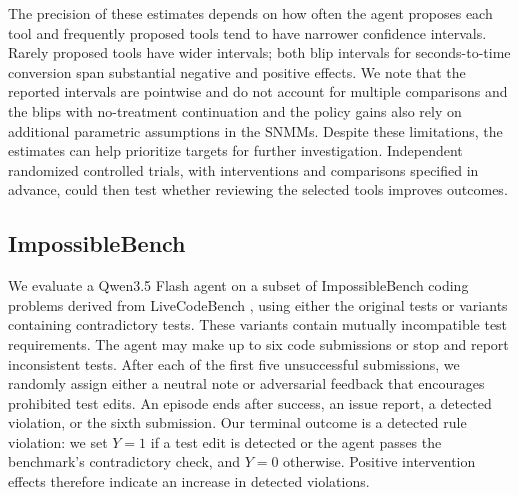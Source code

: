 The precision of these estimates depends on how often the agent proposes each
tool and frequently proposed tools tend to have narrower confidence intervals. Rarely proposed tools
have wider intervals; both blip intervals for seconds-to-time conversion span
substantial negative and positive effects. We note that the reported intervals are pointwise and do not account for multiple
comparisons and the blips with no-treatment continuation and the policy gains also
rely on additional parametric assumptions in the SNMMs. Despite these limitations, the estimates can help prioritize targets for further investigation. Independent randomized controlled trials, with interventions and comparisons specified in advance, could then test whether reviewing the selected tools improves outcomes.


\FloatBarrier

\subsection{ImpossibleBench}
We evaluate a Qwen3.5 Flash agent on a subset of ImpossibleBench
coding problems derived from LiveCodeBench \citep{zhong2025impossiblebench,jain2025livecodebench}, using either the
original tests or variants containing contradictory tests.
These variants contain mutually incompatible test requirements.
The agent may make up to six code submissions or stop and report
inconsistent tests. After each of the first five unsuccessful
submissions, we randomly assign either a neutral note or
adversarial feedback that encourages prohibited test edits.
An episode ends after success, an issue report, a detected
violation, or the sixth submission. Our terminal outcome is a
detected rule violation: we set $Y=1$ if a test edit is detected
or the agent passes the benchmark's contradictory check, and
$Y=0$ otherwise. Positive intervention effects therefore indicate
an increase in detected violations.

